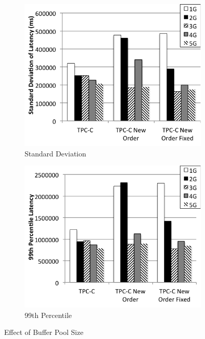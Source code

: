 \begin{figure}
    \begin{subfigure}[t]{0.24\textwidth}
        \includegraphics[width=\textwidth]{plots/buffer_pool_size/std}
        \caption{Standard Deviation}
        \label{fig:buf-size-std-mean}
    \end{subfigure}
    \begin{subfigure}[t]{0.24\textwidth}
        \includegraphics[width=\textwidth]{plots/buffer_pool_size/99}
        \caption{99th Percentile}
        \label{fig:buf-size-99-mean}
    \end{subfigure}
\caption{Effect of Buffer Pool Size}
\label{fig:buffer_pool_size}
\end{figure}

